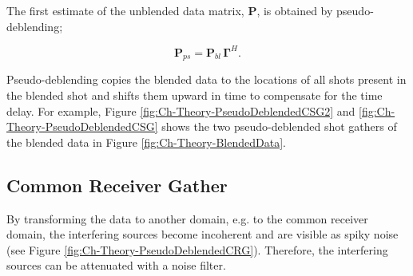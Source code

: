 The first estimate of the unblended data matrix, $\mathbf{P}$, is obtained by pseudo-deblending;

\begin{equation}
	\mathbf{P}_{ps} = \mathbf{P}_{bl} \, \mathbf{\Gamma}^H.
	\label{eq:Ch-Theory-PseudoDeblended}
\end{equation}

Pseudo-deblending copies the blended data to the locations of all shots present in the blended shot and shifts them  upward in time to compensate for the time delay. For example, Figure \ref{fig:Ch-Theory-PseudoDeblendedCSG2} and \ref{fig:Ch-Theory-PseudoDeblendedCSG} shows the two pseudo-deblended shot gathers of the blended data in Figure \ref{fig:Ch-Theory-BlendedData}.


\subsection{Common Receiver Gather}
By transforming the data to another domain, e.g. to the common receiver domain, the interfering sources become incoherent and are visible as spiky noise (see Figure \ref{fig:Ch-Theory-PseudoDeblendedCRG}). Therefore, the interfering sources can be attenuated with a noise filter. 


